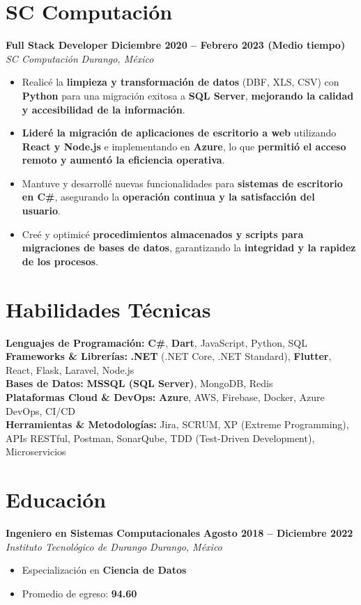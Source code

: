 \documentclass[11pt]{article}
\begin{document}
\section{SC Computación}
\textbf{Full Stack Developer} \hfill \textbf{Diciembre 2020 – Febrero 2023 (Medio tiempo)}\\
\textit{SC Computación} \hfill \textit{Durango, México}\\
\begin{itemize}
    \item Realicé la \textbf{limpieza y transformación de datos} (DBF, XLS, CSV) con \textbf{Python} para una migración exitosa a \textbf{SQL Server}, \textbf{mejorando la calidad y accesibilidad de la información}.
    \item \textbf{Lideré la migración de aplicaciones de escritorio a web} utilizando \textbf{React y Node.js} e implementando en \textbf{Azure}, lo que \textbf{permitió el acceso remoto y aumentó la eficiencia operativa}.
    \item Mantuve y desarrollé nuevas funcionalidades para \textbf{sistemas de escritorio en C\#}, asegurando la \textbf{operación continua y la satisfacción del usuario}.
    \item Creé y optimicé \textbf{procedimientos almacenados y scripts para migraciones de bases de datos}, garantizando la \textbf{integridad y la rapidez de los procesos}.
\end{itemize}

\section{Habilidades Técnicas}
\textbf{Lenguajes de Programación:} \textbf{C\#}, \textbf{Dart}, JavaScript, Python, SQL\\
\textbf{Frameworks \& Librerías:} \textbf{.NET} (.NET Core, .NET Standard), \textbf{Flutter}, React, Flask, Laravel, Node.js\\
\textbf{Bases de Datos:} \textbf{MSSQL (SQL Server)}, MongoDB, Redis\\
\textbf{Plataformas Cloud \& DevOps:} \textbf{Azure}, AWS, Firebase, Docker, Azure DevOps, CI/CD\\
\textbf{Herramientas \& Metodologías:} Jira, SCRUM, XP (Extreme Programming), APIs RESTful, Postman, SonarQube, TDD (Test-Driven Development), Microservicios\\

\section{Educación}
\textbf{Ingeniero en Sistemas Computacionales} \hfill \textbf{Agosto 2018 – Diciembre 2022}\\
\textit{Instituto Tecnológico de Durango} \hfill \textit{Durango, México}\\
\begin{itemize}
    \item Especialización en \textbf{Ciencia de Datos}
    \item Promedio de egreso: \textbf{94.60}
\end{itemize}
\end{document}
